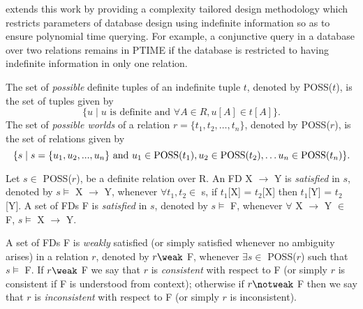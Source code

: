 \medskip

\cite{ivv95} extends this work by providing a complexity tailored
design methodology which restricts parameters of database design using
indefinite information so as to ensure polynomial time querying. For
example, a conjunctive query in a database over two relations remains
in PTIME if the database is restricted to having indefinite
information in only one relation.


\begin{definition}
\begin{rm}
The set of {\em possible} definite tuples of an indefinite tuple $t$, 
denoted by POSS($t$), is the set of tuples given by
\begin{displaymath}
\{u \mid u \mbox{ is definite and } \forall A \in R, u[A] \in t[A]\}.
\end{displaymath}
The set of {\em possible worlds}
of a relation $r = \{t_1, t_2, \ldots, t_n\}$, denoted by POSS($r$),
is the set of relations given by
\begin{displaymath}
\{s \mid s = \{u_1, u_2, ..., u_n\} \mbox{ and } 
u_1 \in {\rm POSS}(t_1), u_2 \in {\rm POSS}(t_2),
\ldots u_n \in {\rm POSS}(t_n)\}.
\end{displaymath}
 \end{rm}
\end{definition}


\begin{definition}\label{def:sat-indef}
\begin{rm}
Let $s \in$ POSS($r$), be a definite relation over R.
An FD X $\to$ Y is {\em satisfied} in $s$,
denoted by $s \models$ X $\to$ Y, whenever
$\forall t_1, t_2 \in$ s, if $t_1$[X] = $t_2$[X] then $t_1$[Y] = $t_2$[Y].
A set of FDs F is {\em satisfied} in $s$,
denoted by $s \models$ F, whenever
$\forall$ X $\to$ Y $\in$ F, $s \models$ X $\to$ Y.

\smallskip

A set of FDs F is {\em weakly} satisfied  
(or simply satisfied whenever no ambiguity arises) in a relation $r$,
denoted by $r \weak$ F, whenever 
$\exists s \in$ POSS($r$) such that $s \models$ F.
If $r \weak$ F we say that $r$ is {\em consistent} with respect to F 
(or simply $r$ is consistent if F is understood from context);
otherwise if $r \notweak$ F then we say that $r$ is {\em inconsistent}
with respect to F (or simply $r$ is inconsistent).
\end{rm}
\end{definition}



